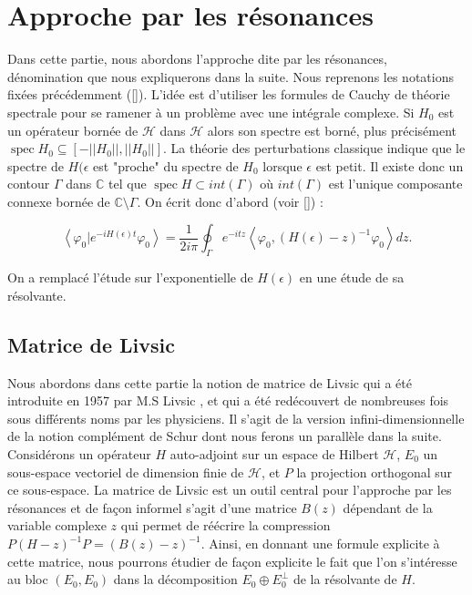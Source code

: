 \documentclass[12pt,openany,a4paper, titlepage]{article}
\newcommand{\f}[2]{\frac{#1}{#2}}
\newcommand{\lp}{\left(}
\newcommand{\rp}{\right)}
\newcommand{\lc}{\left[}
\newcommand{\rcc}{\right]}
\newcommand{\la}{\left\langle}
\newcommand{\ra}{\right\rangle}
\newcommand{\C}{\mathbb{C}}
\newcommand{\HH}{\mathcal{H}}
\newcommand{\spec}{\operatorname{spec}}
\newcommand{\vp}{\varphi}
\newcommand{\He}{H(\epsilon)}
\newcommand{\inv}{^{-1}}
\theoremstyle{definition}
\theoremstyle{definition}
\theoremstyle{definition}
\theoremstyle{definition}
\theoremstyle{definition}
\theoremstyle{definition}
\begin{document}
\newpage
\section{Approche par les résonances}

Dans cette partie, nous abordons l'approche dite par les résonances, dénomination que nous expliquerons dans la suite. Nous reprenons les notations fixées précédemment ([]). L'idée est d'utiliser les formules de Cauchy de théorie spectrale pour se ramener à un problème avec une intégrale complexe. Si $H_0$ est un opérateur bornée de $\mathcal{H}$ dans $\mathcal{H}$ alors son spectre est borné, plus précisément $\spec H_0 \subseteq \lc-||H_0||, ||H_0||\rcc$. La théorie des perturbations classique indique que le spectre de $H(\epsilon$ est "proche" du spectre de $H_0$ lorsque $\epsilon$ est petit. Il existe donc un contour $\Gamma$ dans $\C$ tel que $\spec H \subset int(\Gamma)$ où $int(\Gamma)$ est l'unique composante connexe bornée  de $\C\setminus \Gamma$. On écrit donc d'abord (voir []) :

\begin{equation}
    \la \vp_0 | e^{-i\He t} \vp_0\ra = \f{1}{2i\pi}\oint_\Gamma e^{-itz}\la \varphi_0,\lp H(\epsilon)  -z \rp^{-1} \varphi_0 \ra dz.
\end{equation}

On a remplacé l'étude sur l'exponentielle de $\He$ en une étude de sa résolvante.
\newpage
\subsection{Matrice de Livsic}

Nous abordons dans cette partie la notion de matrice de Livsic qui a été introduite en 1957 par M.S Livsic \cite{HOWLAND1975415}, et qui a été redécouvert de nombreuses fois sous différents noms par les physiciens. Il s'agit de la version infini-dimensionnelle de la notion complément de Schur dont nous ferons un parallèle dans la suite. Considérons un opérateur $H$ auto-adjoint sur un espace de Hilbert $\HH$, $E_0$ un sous-espace vectoriel de dimension finie de $\HH$, et $P$ la projection orthogonal sur ce sous-espace. La matrice de Livsic est un outil central pour l'approche par les résonances et de façon informel s'agit d'une matrice $B(z)$ dépendant de la variable complexe $z$ qui permet de réécrire la compression $P(H-z)\inv P = (B(z) -z)\inv$. Ainsi, en donnant une formule explicite à cette matrice, nous pourrons étudier de façon explicite le fait que l'on s'intéresse au bloc $(E_0,E_0)$ dans la décomposition $E_0\oplus E_0^\perp$ de la résolvante de $H$.
\end{document}
